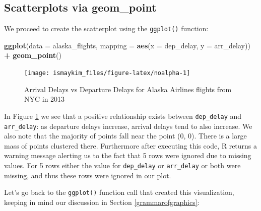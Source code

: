 \documentclass[12pt,]{krantz}
\makeatletter
\newenvironment{Shaded}{\begin{snugshade}}{\end{snugshade}}
\newcommand{\KeywordTok}[1]{\textcolor[rgb]{0.27,0.27,0.27}{\textbf{#1}}}
\newcommand{\DataTypeTok}[1]{\textcolor[rgb]{0.27,0.27,0.27}{#1}}
\newcommand{\StringTok}[1]{\textcolor[rgb]{0.5,0.5,0.5}{#1}}
\newcommand{\OperatorTok}[1]{\textcolor[rgb]{0.43,0.43,0.43}{\textbf{#1}}}
\newcommand{\NormalTok}[1]{#1}
\newenvironment{kframe}{%
\medskip{}
\setlength{\fboxsep}{.8em}
 \def\at@end@of@kframe{}%
 \ifinner\ifhmode%
  \def\at@end@of@kframe{\end{minipage}}%
  \begin{minipage}{\columnwidth}%
 \fi\fi%
 \def\FrameCommand##1{\hskip\@totalleftmargin \hskip-\fboxsep
 \colorbox{shadecolor}{##1}\hskip-\fboxsep
     \hskip-\linewidth \hskip-\@totalleftmargin \hskip\columnwidth}%
 \MakeFramed {\advance\hsize-\width
   \@totalleftmargin\z@ \linewidth\hsize
   \@setminipage}}%
 {\par\unskip\endMakeFramed%
 \at@end@of@kframe}
\renewenvironment{Shaded}{\begin{kframe}}{\end{kframe}}
\theoremstyle{definition}
\theoremstyle{definition}
\theoremstyle{definition}
\theoremstyle{remark}
\makeatother
\begin{document}
\subsection{Scatterplots via geom\_point}\label{geompoint}

We proceed to create the scatterplot using the \texttt{ggplot()}
function:

\begin{Shaded}
\begin{Highlighting}[]
\KeywordTok{ggplot}\NormalTok{(}\DataTypeTok{data =}\NormalTok{ alaska_flights, }
       \DataTypeTok{mapping =} \KeywordTok{aes}\NormalTok{(}\DataTypeTok{x =}\NormalTok{ dep_delay, }\DataTypeTok{y =}\NormalTok{ arr_delay)) }\OperatorTok{+}\StringTok{ }
\StringTok{  }\KeywordTok{geom_point}\NormalTok{()}
\end{Highlighting}
\end{Shaded}

\begin{figure}

{\centering \texttt{[image: ismaykim\_files/figure-latex/noalpha-1]} 

}

\caption{Arrival Delays vs Departure Delays for Alaska Airlines flights from NYC in 2013}\label{fig:noalpha}
\end{figure}

In Figure \ref{fig:noalpha} we see that a positive relationship exists
between \texttt{dep\_delay} and \texttt{arr\_delay}: as departure delays
increase, arrival delays tend to also increase. We also note that the
majority of points fall near the point (0, 0). There is a large mass of
points clustered there. Furthermore after executing this code, R returns
a warning message alerting us to the fact that 5 rows were ignored due
to missing values. For 5 rows either the value for \texttt{dep\_delay}
or \texttt{arr\_delay} or both were missing, and thus these rows were
ignored in our plot.

Let's go back to the \texttt{ggplot()} function call that created this
visualization, keeping in mind our discussion in Section
\ref{grammarofgraphics}:
\end{document}
